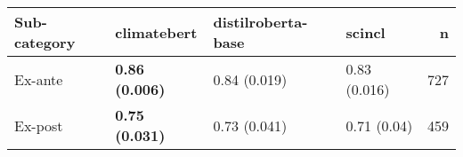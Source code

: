\begin{tabular}{llllr}
\toprule
Sub-category & climatebert & distilroberta-base & scincl & n \\
\midrule
Ex-ante & \textbf{0.86 (0.006)} & 0.84 (0.019) & 0.83 (0.016) & 727 \\
Ex-post & \textbf{0.75 (0.031)} & 0.73 (0.041) & 0.71 (0.04) & 459 \\
\bottomrule
\end{tabular}
